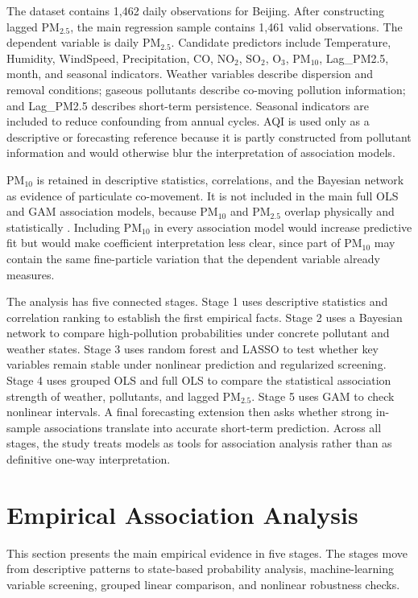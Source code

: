 \documentclass[11pt]{article}
\begin{document}
The dataset contains 1,462 daily observations for Beijing. After constructing lagged PM$_{2.5}$, the main regression sample contains 1,461 valid observations. The dependent variable is daily PM$_{2.5}$. Candidate predictors include Temperature, Humidity, WindSpeed, Precipitation, CO, NO$_2$, SO$_2$, O$_3$, PM$_{10}$, Lag\_PM2.5, month, and seasonal indicators. Weather variables describe dispersion and removal conditions; gaseous pollutants describe co-moving pollution information; and Lag\_PM2.5 describes short-term persistence. Seasonal indicators are included to reduce confounding from annual cycles. AQI is used only as a descriptive or forecasting reference because it is partly constructed from pollutant information and would otherwise blur the interpretation of association models.

PM$_{10}$ is retained in descriptive statistics, correlations, and the Bayesian network as evidence of particulate co-movement. It is not included in the main full OLS and GAM association models, because PM$_{10}$ and PM$_{2.5}$ overlap physically and statistically \cite{who2021}. Including PM$_{10}$ in every association model would increase predictive fit but would make coefficient interpretation less clear, since part of PM$_{10}$ may contain the same fine-particle variation that the dependent variable already measures.

The analysis has five connected stages. Stage 1 uses descriptive statistics and correlation ranking to establish the first empirical facts. Stage 2 uses a Bayesian network to compare high-pollution probabilities under concrete pollutant and weather states. Stage 3 uses random forest and LASSO to test whether key variables remain stable under nonlinear prediction and regularized screening. Stage 4 uses grouped OLS and full OLS to compare the statistical association strength of weather, pollutants, and lagged PM$_{2.5}$. Stage 5 uses GAM to check nonlinear intervals. A final forecasting extension then asks whether strong in-sample associations translate into accurate short-term prediction. Across all stages, the study treats models as tools for association analysis rather than as definitive one-way interpretation.

\section{Empirical Association Analysis}

This section presents the main empirical evidence in five stages. The stages move from descriptive patterns to state-based probability analysis, machine-learning variable screening, grouped linear comparison, and nonlinear robustness checks.
\end{document}
